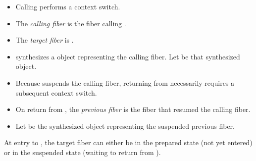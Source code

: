 \begin{itemize}
    \item Calling \resumewith performs a context switch.
    \item The \emph{calling fiber} is the fiber calling \resumewith.
    \item The \emph{target fiber} is \thefiber{\state}.
    \item \resumewith synthesizes a \fiber object representing the calling
          fiber. Let  be that synthesized \fiber object.
    \item Because \resumewith suspends the calling fiber, returning
          from \resumewith necessarily requires a subsequent context switch.
    \item On return from \resumewith, the \emph{previous fiber} is the fiber that
          resumed the calling fiber.
    \item Let  be the synthesized \fiber object representing the
          suspended previous fiber.
\end{itemize}

At entry to \resumewith, the target fiber can either be in the prepared state
(not yet entered) or in the suspended state (waiting to return from \resumewith).

